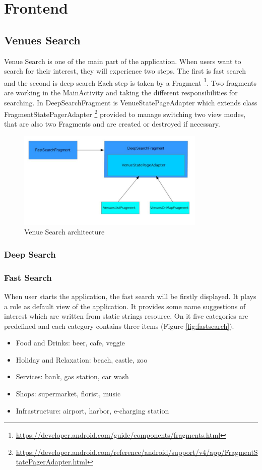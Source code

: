 \section{Frontend}
\label{sec:frontend}

\subsection{Venues Search}
Venue Search is one of the main part of the application. When users want to search for their interest, they will experience two steps. The first is fast search and the second is deep search
Each step is taken by a Fragment \footnote{\url{https://developer.android.com/guide/components/fragments.html}}. Two fragments are working in the MainActivity and taking the different responsibilities for searching. In DeepSearchFragment is VenueStatePageAdapter which extends class FragmentStatePagerAdapter  \footnote{\url{https://developer.android.com/reference/android/support/v4/app/FragmentStatePagerAdapter.html}} provided  to manage switching two view modes, that are also two Fragments and are created or destroyed if necessary.
\begin{figure}[htbp]
	\includegraphics[width=0.8\textwidth]{images/venue_search.jpg}
	\centering
	\caption[]{Venue Search architecture}
	\label{fig:venue_search}
\end{figure} 
\subsubsection{Deep Search}
\subsubsection{Fast Search}
When user starts the application, the fast search will be firstly displayed. It plays a role as default view of the application. It provides some name suggestions of interest which are written from static strings resource. On it five categories are predefined and each category contains three items (Figure \ref{fig:fastsearch}).
\begin{itemize}
	 \item Food and Drinks: beer, cafe, veggie
	 \item Holiday and Relaxation: beach, castle, zoo
	 \item Services: bank, gas station, car wash
	 \item Shops: supermarket, florist, music
	 \item Infrastructure: airport, harbor, e-charging station
\end{itemize}

